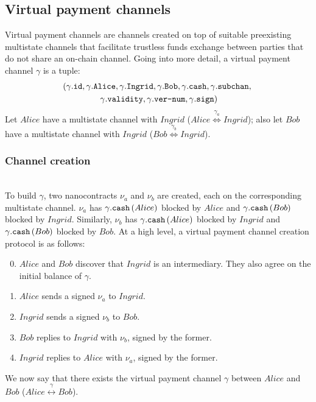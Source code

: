\subsection{Virtual payment channels}
  Virtual payment channels are channels created on top of suitable preexisting multistate
  channels that facilitate trustless funds exchange between parties that do not share an
  on-chain channel. Going into more detail, a virtual payment channel $\gamma$ is a tuple:
  \begin{gather*}
    \left(\gamma\mbox{.\texttt{id}}, \gamma\mbox{.\texttt{Alice}},
    \gamma\mbox{.\texttt{Ingrid}}, \gamma\mbox{.\texttt{Bob}},
    \gamma\mbox{.\texttt{cash}}, \gamma\mbox{.\texttt{subchan}}, \right. \\
    \left.\gamma\mbox{.\texttt{validity}}, \gamma\mbox{.\texttt{ver-num}},
    \gamma\mbox{.\texttt{sign}}\right)
  \end{gather*}
  Let $Alice$ have a multistate channel with $Ingrid$ ($Alice
  \overset{\gamma_a}{\Leftrightarrow} Ingrid$); also let $Bob$ have a multistate channel
  with $Ingrid$ ($Bob \overset{\gamma_b}{\Leftrightarrow} Ingrid$).

  \subsubsection{Channel creation} \ \\

    To build $\gamma$, two nanocontracts $\nu_a$ and $\nu_b$ are created, each on the
    corresponding multistate channel. $\nu_a$ has
    $\gamma\mbox{.\texttt{cash}}\left(Alice\right)$ blocked by $Alice$ and
    $\gamma\mbox{.\texttt{cash}}\left(Bob\right)$ blocked by $Ingrid$. Similarly, $\nu_b$
    has $\gamma\mbox{.\texttt{cash}}\left(Alice\right)$ blocked by $Ingrid$ and
    $\gamma\mbox{.\texttt{cash}}\left(Bob\right)$ blocked by $Bob$. At a high level, a
    virtual payment channel creation protocol is as follows:
    \begin{enumerate}
    \setcounter{enumi}{-1}
      \item $Alice$ and $Bob$ discover that $Ingrid$ is an intermediary. They also agree
      on the initial balance of $\gamma$.
      \item $Alice$ sends a signed $\nu_a$ to $Ingrid$.
      \item $Ingrid$ sends a signed $\nu_b$ to $Bob$.
      \item $Bob$ replies to $Ingrid$ with $\nu_b$, signed by the former.
      \item $Ingrid$ replies to $Alice$ with $\nu_a$, signed by the former.
    \end{enumerate}

    We now say that there exists the virtual payment channel $\gamma$ between $Alice$ and
    $Bob$ ($Alice \overset{\gamma}{\leftrightarrow} Bob$).
